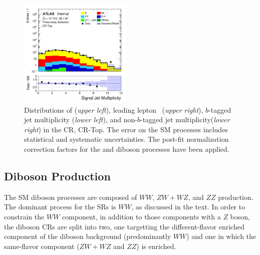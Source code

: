 \begin{figure}[!htb]
\begin{center}
        \includegraphics[width=0.48\textwidth]{figures/search_stop2l/bkg_est/crtop/crt_nSJets}
        \caption{
            Distributions of \rpt (\textit{upper left}), leading lepton \gaminv~(\textit{upper right}),
            $b$-tagged jet multiplicity (\textit{lower left}), and non-$b$-tagged jet multiplicity(\textit{lower right}) in the \ttbar CR,
            CR-Top.
            The error on the SM processes includes statistical and systematic uncertainties.
            The post-fit normalization correction factors for the \ttbar and diboson processes
            have been applied.
        }
        \label{fig:crt_1}
    \end{center}
\end{figure}



%
%

\subsection{Diboson Production}
\label{sec:stop_vv_estimate}

The SM diboson processes are composed of $WW$, $ZW+WZ$, and $ZZ$ production.
The dominant process for the \bWN SRs is $WW$, as discussed in the text.
In order to constrain the $WW$ component, in addition to those components with a $Z$ boson,
the diboson CRs are split into two, one targetting the different-flavor enriched component
of the diboson background (predominantly $WW$) and one in which the same-flavor component ($ZW+WZ$ and $ZZ$)
is enriched.


